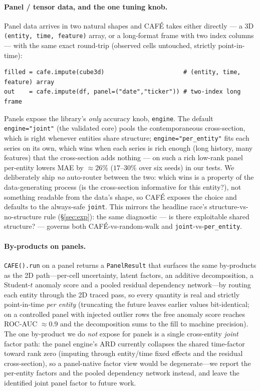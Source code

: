 \documentclass[10pt,twocolumn]{article}
\newcommand{\cafe}{CAF\'E}
\begin{document}
\paragraph{Panel / tensor data, and the one tuning knob.} Panel data arrives in two
natural shapes and \cafe{} takes either directly --- a 3D \texttt{(entity, time,
feature)} array, or a long-format frame with two index columns --- with the same
exact round-trip (observed cells untouched, strictly point-in-time):
\begin{lstlisting}[style=cafepy]
filled = cafe.impute(cube3d)                      # (entity, time, feature) array
out    = cafe.impute(df, panel=("date","ticker")) # two-index long frame
\end{lstlisting}
Panels expose the library's \emph{only} accuracy knob, \texttt{engine}. The default
\texttt{engine="joint"} (the validated core) pools the contemporaneous cross-section,
which is right whenever entities share structure; \texttt{engine="per\_entity"} fits
each series on its own, which wins when each series is rich enough (long history, many
features) that the cross-section adds nothing --- on such a rich low-rank panel
per-entity lowers MAE by $\approx\!26\%$ ($17$--$30\%$ over six seeds) in our tests. We
deliberately ship \emph{no} auto-router between the two: which wins is a property of the
data-generating process (is the cross-section informative for this entity?), not
something readable from the data's shape, so \cafe{} exposes the choice and defaults to
the always-safe \texttt{joint}. This mirrors the headline race's structure-vs-no-structure
rule (\S\ref{sec:exp}): the same diagnostic --- is there exploitable shared structure? ---
governs both \cafe{}-vs-random-walk and \texttt{joint}-vs-\texttt{per\_entity}.

\paragraph{By-products on panels.} \texttt{CAFE().run} on a panel returns a
\texttt{PanelResult} that surfaces the same by-products as the 2D path---per-cell
uncertainty, latent factors, an additive decomposition, a Student-$t$ anomaly score and a
pooled residual dependency network---by routing each entity through the 2D traced pass, so
every quantity is real and strictly point-in-time \emph{per entity} (truncating the future
leaves earlier values bit-identical; on a controlled panel with injected outlier rows the
free anomaly score reaches ROC-AUC $\approx\!0.9$ and the decomposition sums to the fill to
machine precision). The one by-product we do \emph{not} expose for panels is a single
cross-entity \emph{joint} factor path: the panel engine's ARD currently collapses the
shared time-factor toward rank zero (imputing through entity/time fixed effects and the
residual cross-section), so a panel-native factor view would be degenerate---we report the
per-entity factors and the pooled dependency network instead, and leave the identified
joint panel factor to future work.
\end{document}
